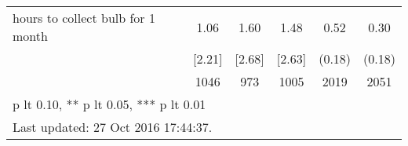 \begin{table}[htbp]
\begin{tabular*}{0.9\hsize}{@{\hskip\tabcolsep\extracolsep\fill}l*{1}{ccccc}}
hours to collect bulb for 1 month&     1.06&     1.60&     1.48&     0.52\sym{***}&     0.30         \\
                                &   [2.21]&   [2.68]&   [2.63]&   (0.18)         &   (0.18)         \\
                                &     1046&      973&     1005&     2019         &     2051         \\
\bottomrule
\multicolumn{6}{l}{\footnotesize * p lt 0.10, ** p lt 0.05, *** p lt 0.01}\\
\multicolumn{6}{l}{\footnotesize Last updated: 27 Oct 2016 17:44:37.}\\
\end{tabular*}
\end{table}
